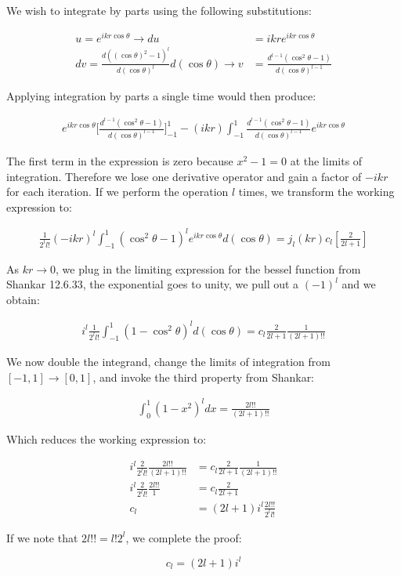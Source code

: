 \documentclass[paper=a4, fontsize=11pt]{scrartcl} %
\numberwithin{equation}{section} %
\numberwithin{figure}{section} %
\numberwithin{table}{section} %
\begin{document}
We wish to integrate by parts using the following substitutions:

\begin{align}
u = e^{i k r \cos\theta} \rightarrow du &= i k r e^{i k r \cos\theta} \\
dv = \frac{d((\cos\theta)^2 - 1)^l}{d(\cos\theta)^l} d(\cos\theta) \rightarrow v &= \frac{d^{l-1}(\cos^2\theta - 1)}{d(\cos\theta)^{l-1}}
\end{align}

Applying integration by parts a single time would then produce:

\begin{align}
e^{i k r \cos\theta} \bigg[ \frac{d^{l-1}(\cos^2\theta - 1)}{d(\cos\theta)^{l-1}} \bigg]^{1}_{-1} - (i k r)\int_{-1}^{1} \frac{d^{l-1}(\cos^2\theta - 1)}{d(\cos\theta)^{l-1}} e^{i k r \cos\theta}
\end{align}

The first term in the expression is zero because $x^2 -1 = 0$ at the limits of integration. Therefore we lose one derivative operator and gain a factor of $-ikr$ for each iteration. If we perform the operation $l$ times, we transform the working expression to:

\begin{align}
\frac{1}{2^l l!}(-ikr)^l \int^{1}_{-1} (\cos^2 \theta - 1)^l e^{i k r \cos\theta} d(\cos\theta) = j_{l}(kr) c_l [\frac{2}{2l+1}]
\end{align}

As $kr \rightarrow 0$, we plug in the limiting expression for the bessel function from Shankar 12.6.33, the exponential goes to unity, we pull out a $(-1)^l$ and we obtain:

\begin{align}
i^l\frac{1}{2^l l!}\int_{-1}^1 (1 - \cos^2 \theta)^l d(\cos\theta) = c_l \frac{2}{2l+1} \frac{1}{(2l+1)!!}
\end{align}

We now double the integrand, change the limits of integration from $[-1,1] \rightarrow [0,1]$, and invoke the third property from Shankar:

\begin{align}
\int_{0}^1 (1-x^2)^l dx = \frac{2l!!}{(2l+1)!!}
\end{align}

Which reduces the working expression to:

\begin{align}
i^l \frac{2}{2^l l!} \frac{2l!!}{(2l+1)!!} &= c_l \frac{2}{2l+1} \frac{1}{(2l+1)!!} \\
i^l \frac{2}{2^l l!} \frac{2l!!}{1} &= c_l \frac{2}{2l+1} \\
c_l &= (2l+1) i^l \frac{2l!!}{2^l l!} 
\end{align}

If we note that $2l!! = l! 2^l$, we complete the proof:

\begin{equation}
c_l = (2l+1)i^l
\end{equation}




\end{document}
